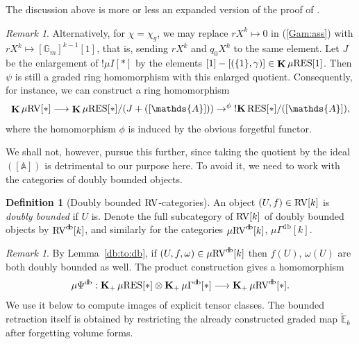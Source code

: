 \documentclass[12pt]{amsart}
\newcommand{\memph}[1]{{\color{magenta}\emph{#1}}}
\theoremstyle{plain}
\theoremstyle{definition}
\newtheorem{defn}[thm]{Definition}
\theoremstyle{remark}
\newtheorem{rem}[thm]{Remark}
\numberwithin{equation}{section}
\theoremstyle{plain}
\newcommand{\RV}{\textup{RV}}
\newcommand{\A}{\mathds{A}}
\newcommand{\G}{\mathds{G}}
\newcommand{\0}{\emptyset}
\newcommand{\bb}[1]{\mathbb{#1}}
\newcommand{\fun}{\longrightarrow}
\newcommand{\efun}{\longmapsto}
\newcommand{\mgRV}{{\mu}{\RV}}
\newcommand{\mG}{{\mu}{\Gamma}}
\newcommand{\RES}{\textup{RES}}
\newcommand{\mgRES}{{\mu}{\RES}}
\DeclareMathOperator{\gsk}{\mathbf{K}_+}
\DeclareMathOperator{\ggk}{\mathbf{K}}
\DeclareMathOperator{\sggk}{!\mathbf{K}}
\DeclareMathOperator{\db}{d \! b}
\begin{document}
The discussion above is more or less an expanded version of the proof of \cite[Theorem~10.11]{hrushovski:kazhdan:integration:vf}.

\begin{rem}
Alternatively, for $\chi = \chi_{g}$, we may replace $r X^k \efun 0$ in (\ref{Gam:ass}) with $r X^k \efun [\G_m]^{k-1}[1]$, that is, sending $r X^k$ and $q_0 X^k$ to the same element.  Let $J$ be the enlargement of $!\mu I[*]$ by the elements $[1]-[(\{1\},\gamma)]\in\ggk\mgRES[1]$. Then $\psi$ is still a graded ring homomorphism with this enlarged quotient. Consequently, for instance, we can construct a ring homomorphism
\begin{equation}\label{res:forget}
\ggk \mgRV[*] \fun \ggk \mgRES[*] / (J+([\A])) \to^{\phi} \sggk \RES[*] / ([\A]),
\end{equation}
where the homomorphism $\phi$ is induced by the obvious forgetful functor.


We shall not, however, pursue this further, since taking the quotient by the ideal $([\A])$ is detrimental to our purpose here. To avoid it, we need to work with the categories of doubly bounded objects.
\end{rem}

\begin{defn}[Doubly bounded $\RV$-categories]\label{db:RV}
An object $(U, f) \in \RV[k]$ is \memph{doubly bounded} if $U$ is. Denote the full subcategory of $\RV[k]$ of doubly bounded objects by $\RV^{\db}[k]$, and similarly for the categories $\mgRV^{\db}[k]$, $\mG^{\db}[k]$.
\end{defn}


\begin{rem}\label{tensor:bd}
By Lemma~\ref{db:to:db}, if $(U, f, \omega) \in \mgRV^{\db}[k]$ then $f(U)$, $\omega(U)$ are both doubly bounded as well.
The product construction gives a homomorphism
\[
{\mu}\Psi^{\db}:\gsk\mgRES[*]\otimes\gsk\mG^{\db}[*]
\fun\gsk\mgRV^{\db}[*].
\]
We use it below to compute images of explicit tensor classes. The bounded retraction itself is obtained by restricting the already constructed graded map $\widetilde{\bb E}_b$ after forgetting volume forms.
\end{rem}
\end{document}
